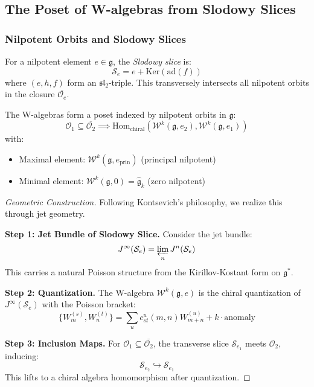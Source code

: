 \subsection{The Poset of W-algebras from Slodowy Slices}
 
\subsubsection{Nilpotent Orbits and Slodowy Slices}
 
\begin{definition}\label{def:slodowy}
For a nilpotent element $e \in \mathfrak{g}$, the \emph{Slodowy slice} is:
\[
\mathcal{S}_e = e + \text{Ker}(\text{ad}(f))
\]
where $(e,h,f)$ form an $\mathfrak{sl}_2$-triple. This transversely intersects all nilpotent orbits 
in the closure $\overline{\mathcal{O}_e}$.
\end{definition}
 
\begin{theorem}\label{thm:w-poset}
The W-algebras form a poset indexed by nilpotent orbits in $\mathfrak{g}$:
\[
\mathcal{O}_1 \subseteq \overline{\mathcal{O}_2} \implies 
\text{Hom}_{\text{chiral}}(\mathcal{W}^k(\mathfrak{g}, e_2), \mathcal{W}^k(\mathfrak{g}, e_1))
\]
with:
\begin{itemize}
\item Maximal element: $\mathcal{W}^k(\mathfrak{g}, e_{\text{prin}})$ (principal nilpotent)
\item Minimal element: $\mathcal{W}^k(\mathfrak{g}, 0) = \widehat{\mathfrak{g}}_k$ (zero nilpotent)
\end{itemize}
\end{theorem}
 
\begin{proof}[Geometric Construction]
Following Kontsevich's philosophy, we realize this through jet geometry.
 
\textbf{Step 1: Jet Bundle of Slodowy Slice.} Consider the jet bundle:
\[
J^{\infty}(\mathcal{S}_e) = \varprojlim_{n} J^n(\mathcal{S}_e)
\]
This carries a natural Poisson structure from the Kirillov-Kostant form on $\mathfrak{g}^*$.
 
\textbf{Step 2: Quantization.} The W-algebra $\mathcal{W}^k(\mathfrak{g}, e)$ is the chiral 
quantization of $J^{\infty}(\mathcal{S}_e)$ with the Poisson bracket:
\[
\{W^{(s)}_m, W^{(t)}_n\} = \sum_{u} c_{st}^u(m,n) W^{(u)}_{m+n} + k \cdot \text{anomaly}
\]
 
\textbf{Step 3: Inclusion Maps.} For $\mathcal{O}_1 \subseteq \overline{\mathcal{O}_2}$, the 
transverse slice $\mathcal{S}_{e_1}$ meets $\mathcal{O}_2$, inducing:
\[
\mathcal{S}_{e_2} \hookrightarrow \mathcal{S}_{e_1}
\]
This lifts to a chiral algebra homomorphism after quantization.
\end{proof}
 

